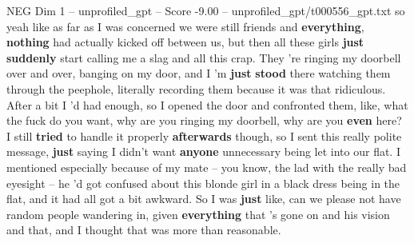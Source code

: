 \begin{textsample}{NEG Dim 1 – unprofiled\_gpt – Score -9.00 – unprofiled\_gpt/t000556\_gpt.txt}  \label{ex:f1_neg_024}
so yeah like as far as I was concerned we were still friends and \textbf{everything}, \textbf{nothing} had actually kicked off between us, but then all these girls \textbf{just} \textbf{suddenly} start calling me a slag and all this crap.
They ’re ringing my doorbell over and over, banging on my door, and I ’m \textbf{just} \textbf{stood} there watching them through the peephole, literally recording them because it was that ridiculous.
After a bit I ’d had enough, so I opened the door and confronted them, like, what the fuck do you want, why are you ringing my doorbell, why are you \textbf{even} here?
I still \textbf{tried} to handle it properly \textbf{afterwards} though, so I sent this really polite message, \textbf{just} saying I didn't want \textbf{anyone} unnecessary being let into our flat.
I mentioned especially because of my mate – you know, the lad with the really bad eyesight – he ’d got confused about this blonde girl in a black dress being in the flat, and it had all got a bit awkward.
So I was \textbf{just} like, can we please not have random people wandering in, given \textbf{everything} that ’s gone on and his vision and that, and I thought that was more than reasonable.

\end{textsample}
